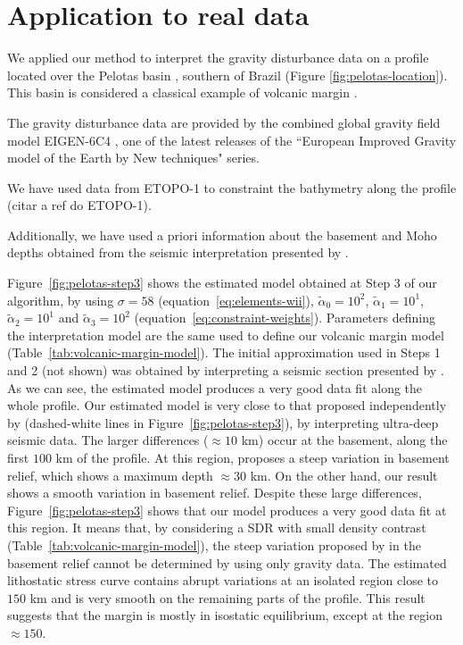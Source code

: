 \documentclass[manuscript]{geophysics}
\begin{document}
\section{Application to real data}

We applied our method to interpret the gravity disturbance data 
on a profile located over the Pelotas basin
\citep{stica-etal2014}, southern of Brazil (Figure \ref{fig:pelotas-location}). This basin is 
considered a classical example of volcanic margin \citep{geoffroy2005}.

The gravity disturbance data are provided by the combined global gravity field model EIGEN-6C4
\citep{forste2014}, one of the latest releases of the ``European Improved Gravity model of 
the Earth by New techniques" series.

We have used data from ETOPO-1 to constraint the bathymetry along the profile
(citar a ref do ETOPO-1).

Additionally, we have used a priori information about the basement and Moho depths
obtained from the seismic interpretation presented by \citet{zalan2015}.

Figure~\ref{fig:pelotas-step3} shows the estimated model obtained at Step 3
of our algorithm, by using $\sigma = 58$ (equation~\ref{eq:elements-wii}), 
$\tilde{\alpha}_{0} = 10^{2}$, $\tilde{\alpha}_{1} = 10^{1}$, 
$\tilde{\alpha}_{2} = 10^{1}$ and $\tilde{\alpha}_{3} = 10^{2}$
(equation~\ref{eq:constraint-weights}).
Parameters defining the interpretation model are the same used
to define our volcanic margin model (Table~\ref{tab:volcanic-margin-model}).
The initial approximation used in Steps 1 and 2 (not shown) was obtained by 
interpreting a seismic section presented by \citet{stica-etal2014}.
As we can see, the estimated model produces a very good data fit along the whole
profile. Our estimated model is very close to that proposed independently by
\citet{zalan2015} (dashed-white lines in Figure~\ref{fig:pelotas-step3}), by
interpreting ultra-deep seismic data.
The larger differences ($\approx 10$ km) occur at the basement, along the first 
$100$ km of the profile.
At this region, \citeauthor{zalan2015} proposes a steep variation in basement
relief, which shows a maximum depth $\approx 30$ km. On the other hand, our result 
shows a smooth variation in basement relief. Despite these large differences,
Figure~\ref{fig:pelotas-step3} shows that our model produces a very good data fit
at this region. It means that, by considering a SDR with small density contrast 
(Table~\ref{tab:volcanic-margin-model}), the steep variation 
proposed by \citeauthor{zalan2015} in the basement relief cannot be determined by 
using only gravity data.
The estimated lithostatic stress curve contains abrupt variations
at an isolated region close to $150$ km and is very smooth on the remaining parts
of the profile. This result suggests that the margin is mostly in isostatic 
equilibrium, except at the region $\approx 150$.
\end{document}
